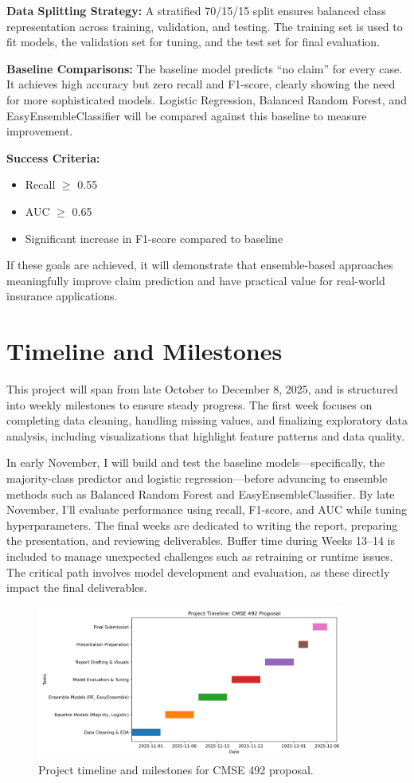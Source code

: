 \documentclass[11pt]{article}
\begin{document}
\textbf{Data Splitting Strategy:}  
A stratified 70/15/15 split ensures balanced class representation across training, validation, and testing. The training set is used to fit models, the validation set for tuning, and the test set for final evaluation.

\textbf{Baseline Comparisons:}  
The baseline model predicts “no claim” for every case. It achieves high accuracy but zero recall and F1-score, clearly showing the need for more sophisticated models. Logistic Regression, Balanced Random Forest, and EasyEnsembleClassifier will be compared against this baseline to measure improvement.

\textbf{Success Criteria:}
\begin{itemize}
    \item Recall $\geq$ 0.55
    \item AUC $\geq$ 0.65
    \item Significant increase in F1-score compared to baseline
\end{itemize}

If these goals are achieved, it will demonstrate that ensemble-based approaches meaningfully improve claim prediction and have practical value for real-world insurance applications.

\section{Timeline and Milestones}
This project will span from late October to December 8, 2025, and is structured into weekly milestones to ensure steady progress. The first week focuses on completing data cleaning, handling missing values, and finalizing exploratory data analysis, including visualizations that highlight feature patterns and data quality.

In early November, I will build and test the baseline models—specifically, the majority-class predictor and logistic regression—before advancing to ensemble methods such as Balanced Random Forest and EasyEnsembleClassifier. By late November, I’ll evaluate performance using recall, F1-score, and AUC while tuning hyperparameters. The final weeks are dedicated to writing the report, preparing the presentation, and reviewing deliverables. Buffer time during Weeks 13–14 is included to manage unexpected challenges such as retraining or runtime issues. The critical path involves model development and evaluation, as these directly impact the final deliverables.

\begin{figure}[h]
    \centering
    \includegraphics[width=0.9\textwidth]{../figures/gantt_chart.png}
    \caption{Project timeline and milestones for CMSE 492 proposal.}
\end{figure}
\end{document}
